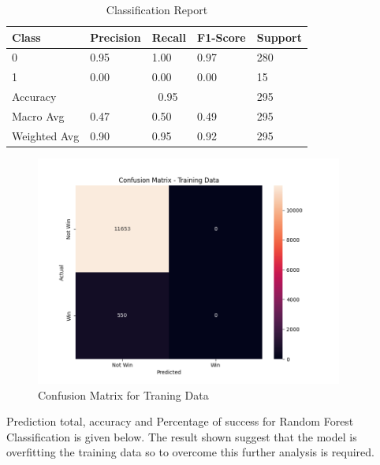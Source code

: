 \documentclass[11pt,article,oneside]{article}
\begin{document}
\begin{table}[H]
    \centering
    \caption{Classification Report}
    \label{tab:best_model_classification_report}
    \begin{tabular}{|l|l|l|l|l|}
    \hline
    \textbf{Class}  & \textbf{Precision} & \textbf{Recall} & \textbf{F1-Score} & \textbf{Support}  \\ \hline
    0               & 0.95              & 1.00             & 0.97              & 280                  \\ \hline
    1               & 0.00              & 0.00             & 0.00              & 15                   \\ \hline
    Accuracy        & \multicolumn{3}{c}{\hspace{3cm} 0.95}                    & 295                  \\ \hline
    Macro Avg       & 0.47              & 0.50             & 0.49              & 295                   \\ \hline
    Weighted Avg    & 0.90              & 0.95             & 0.92              & 295                   \\ \hline
    \end{tabular}
\end{table}

\begin{figure}[htbp]
    \centering
    \includegraphics[width=0.9\textwidth]{code/Images/confusion_matrix.png}
    \caption{Confusion Matrix for Traning Data}
\end{figure}

Prediction total, accuracy and Percentage of success for Random Forest Classification is given below. The result shown suggest that the model is overfitting the training data so to overcome this further analysis is required.
\end{document}
